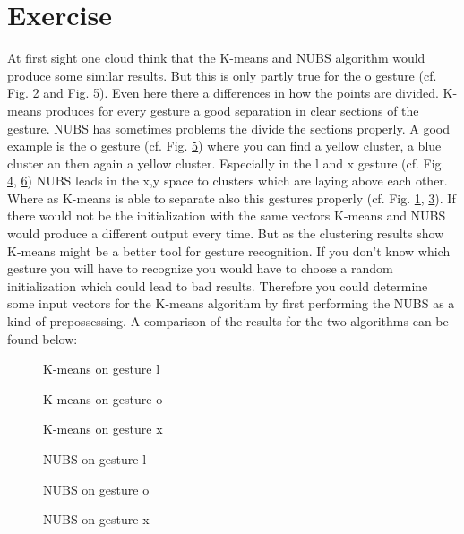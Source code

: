 \documentclass[conference]{IEEEtran}
\begin{document}
\section{Exercise}
At first sight one cloud think that the K-means and NUBS algorithm would produce some similar results. But this is only partly true for the o gesture (cf. Fig. \ref{fig:kmean_o} and Fig. \ref{fig:nubs_o}). Even here there a differences in how the points are divided. K-means produces for every gesture a good separation in clear sections of the gesture. NUBS has sometimes problems the divide the sections properly. A good example is the o gesture (cf. Fig. \ref{fig:nubs_o}) where you can find a yellow cluster, a blue cluster an then again a yellow cluster. Especially in the l and x gesture (cf. Fig. \ref{fig:nubs_l}, \ref{fig:nubs_x}) NUBS leads in the x,y space to clusters which are laying above each other. Where as K-means is able to separate also this gestures properly (cf. Fig. \ref{fig:kmean_l}, \ref{fig:kmean_x}). If there would not be the initialization with the same vectors K-means and NUBS would produce a different output every time. But as the clustering results show K-means might be a better tool for gesture recognition. If you don't know which gesture you will have to recognize you would have to choose a random initialization which could lead to bad results. Therefore you could determine some input vectors for the K-means algorithm by first performing the NUBS as a kind of prepossessing. A comparison of the results for the two algorithms can be found below:

\begin{figure}[h!]
  	\centering
    \scalebox{.5}{}
    \caption{K-means on gesture l}
    \label{fig:kmean_l}
\end{figure}

\begin{figure}[h!]
  	\centering
    \scalebox{.5}{}
    \caption{K-means on gesture o}
    \label{fig:kmean_o}
\end{figure}

\begin{figure}[h!]
  	\centering
    \scalebox{.5}{}
    \caption{K-means on gesture x}
    \label{fig:kmean_x}
\end{figure}

\begin{figure}[h!]
  	\centering
    \scalebox{.5}{}
    \caption{NUBS on gesture l}
    \label{fig:nubs_l}
\end{figure}

\begin{figure}[h!]
  	\centering
    \scalebox{.5}{}
    \caption{NUBS on gesture o}
    \label{fig:nubs_o}
\end{figure}

\begin{figure}[h!]
  	\centering
    \scalebox{.5}{}
    \caption{NUBS on gesture x}
    \label{fig:nubs_x}
\end{figure}
\end{document}
